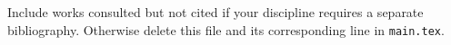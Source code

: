 
Include works consulted but not cited if your discipline requires a separate
bibliography. Otherwise delete this file and its corresponding
\texttt{\string} line in \texttt{main.tex}.

